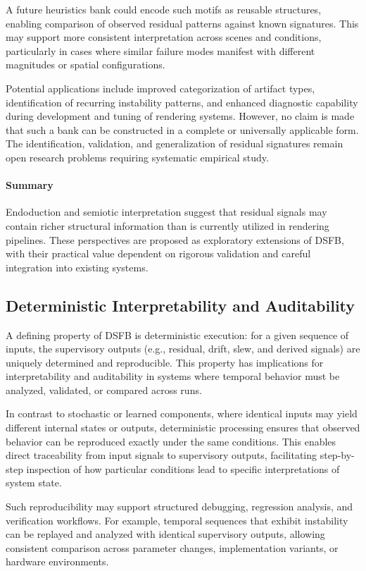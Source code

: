 \documentclass[11pt,letterpaper]{article}
\theoremstyle{gcresult}
\theoremstyle{definition}
\begin{document}
A future heuristics bank could encode such motifs as reusable structures, enabling comparison of observed residual patterns against known signatures. This may support more consistent interpretation across scenes and conditions, particularly in cases where similar failure modes manifest with different magnitudes or spatial configurations.

Potential applications include improved categorization of artifact types, identification of recurring instability patterns, and enhanced diagnostic capability during development and tuning of rendering systems. However, no claim is made that such a bank can be constructed in a complete or universally applicable form. The identification, validation, and generalization of residual signatures remain open research problems requiring systematic empirical study.

\paragraph{Summary}
Endoduction and semiotic interpretation suggest that residual signals may contain richer structural information than is currently utilized in rendering pipelines. These perspectives are proposed as exploratory extensions of DSFB, with their practical value dependent on rigorous validation and careful integration into existing systems.


\subsection{Deterministic Interpretability and Auditability}

A defining property of DSFB is deterministic execution: for a given sequence of inputs, the supervisory outputs (e.g., residual, drift, slew, and derived signals) are uniquely determined and reproducible. This property has implications for interpretability and auditability in systems where temporal behavior must be analyzed, validated, or compared across runs.

In contrast to stochastic or learned components, where identical inputs may yield different internal states or outputs, deterministic processing ensures that observed behavior can be reproduced exactly under the same conditions. This enables direct traceability from input signals to supervisory outputs, facilitating step-by-step inspection of how particular conditions lead to specific interpretations of system state.

Such reproducibility may support structured debugging, regression analysis, and verification workflows. For example, temporal sequences that exhibit instability can be replayed and analyzed with identical supervisory outputs, allowing consistent comparison across parameter changes, implementation variants, or hardware environments.
\end{document}
